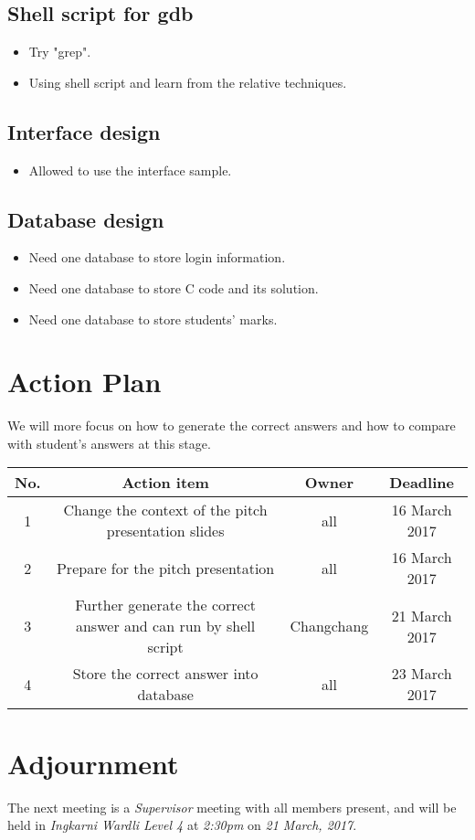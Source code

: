 \documentclass[11pt, a4paper]{article}
\begin{document}
\subsection{Shell script for gdb}
\begin{itemize}
\item Try "grep".
\item Using shell script and learn from the relative techniques.
\end{itemize}

\subsection{Interface design}
\begin{itemize}
\item Allowed to use the interface sample.
\end{itemize}

\subsection{Database design}
\begin{itemize}
\item Need one database to store login information.
\item Need one database to store C code and its solution.
\item Need one database to store students' marks.
\end{itemize}




\section{Action Plan}
We will more focus on how to generate the correct answers and how to compare with student's answers at this stage.

\vspace{10pt}
\begin{tabular}{|c|c|c|c|}
\hline
No. & Action item & Owner & Deadline \\
\hline
\hline
1 & Change the context of the pitch presentation slides & all & 16 March 2017 \\
\hline
2 & Prepare for the pitch presentation & all & 16 March 2017 \\
\hline
3 & Further generate the correct answer and can run by shell script & Changchang & 21 March 2017 \\
\hline
4 & Store the correct answer into database & all & 23 March 2017\\
\hline
\end{tabular}

\section{Adjournment}
The next meeting is a \emph{Supervisor} meeting with all members present, and will be held in \emph{Ingkarni Wardli Level 4} at \emph{2:30pm} on \emph{21 March, 2017}.
\end{document}

